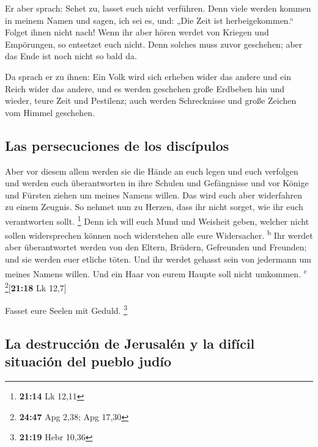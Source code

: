  Er aber sprach: Sehet zu, lasset euch nicht verführen.
Denn viele werden kommen in meinem Namen und sagen, ich sei es, und:
„Die Zeit ist herbeigekommen.`` Folget ihnen nicht nach! 
Wenn ihr aber hören werdet von Kriegen und Empörungen, so entsetzet euch
nicht. Denn solches muss zuvor geschehen; aber das Ende ist noch nicht
so bald da.

 Da sprach er zu ihnen: Ein Volk wird sich erheben wider
das andere und ein Reich wider das andere,  und es werden
geschehen große Erdbeben hin und wieder, teure Zeit und Pestilenz; auch
werden Schrecknisse und große Zeichen vom Himmel geschehen.

\hypertarget{las-persecuciones-de-los-discuxedpulos}{%
\subsection{Las persecuciones de los
discípulos}\label{las-persecuciones-de-los-discuxedpulos}}

 Aber vor diesem allem werden sie die Hände an euch legen
und euch verfolgen und werden euch überantworten in ihre Schulen und
Gefängnisse und vor Könige und Fürsten ziehen um meines Namens willen.
 Das wird euch aber widerfahren zu einem Zeugnis.
 So nehmet nun zu Herzen, dass ihr nicht sorget, wie ihr
euch verantworten sollt. \footnote{\textbf{21:14} Lk 12,11}
 Denn ich will euch Mund und Weisheit geben, welcher
nicht sollen widersprechen können noch widerstehen alle eure
Widersacher. \textsuperscript{b}  Ihr werdet aber
überantwortet werden von den Eltern, Brüdern, Gefreunden und Freunden;
und sie werden euer etliche töten.  Und ihr werdet
gehasst sein von jedermann um meines Namens willen.  Und
ein Haar von eurem Haupte soll nicht umkommen. \textsuperscript{c}
\footnote{\textbf{24:47} Apg 2,38; Apg 17,30}{[}\textbf{21:18} Lk
12,7{]}

 Fasset eure Seelen mit Geduld. \footnote{\textbf{21:19}
  Hebr 10,36}

\hypertarget{la-destrucciuxf3n-de-jerusaluxe9n-y-la-difuxedcil-situaciuxf3n-del-pueblo-juduxedo}{%
\subsection{La destrucción de Jerusalén y la difícil situación del
pueblo
judío}\label{la-destrucciuxf3n-de-jerusaluxe9n-y-la-difuxedcil-situaciuxf3n-del-pueblo-juduxedo}}

